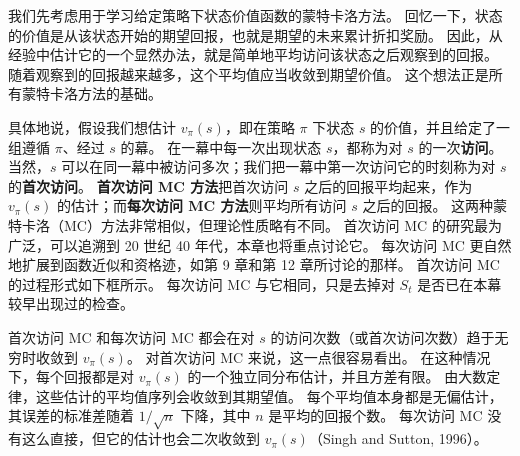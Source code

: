 \documentclass[UTF8, 12pt, fontset=fandol, oneside]{ctexart}
\begin{document}
我们先考虑用于学习给定策略下状态价值函数的蒙特卡洛方法。
回忆一下，状态的价值是从该状态开始的期望回报，也就是期望的未来累计折扣奖励。
因此，从经验中估计它的一个显然办法，就是简单地平均访问该状态之后观察到的回报。
随着观察到的回报越来越多，这个平均值应当收敛到期望价值。
这个想法正是所有蒙特卡洛方法的基础。

具体地说，假设我们想估计 $v_\pi(s)$，即在策略 $\pi$ 下状态 $s$ 的价值，并且给定了一组遵循 $\pi$、经过 $s$ 的幕。
在一幕中每一次出现状态 $s$，都称为对 $s$ 的一次\textbf{访问}。
当然，$s$ 可以在同一幕中被访问多次；我们把一幕中第一次访问它的时刻称为对 $s$ 的\textbf{首次访问}。
\textbf{首次访问 MC 方法}把首次访问 $s$ 之后的回报平均起来，作为 $v_\pi(s)$ 的估计；而\textbf{每次访问 MC 方法}则平均所有访问 $s$ 之后的回报。
这两种蒙特卡洛（MC）方法非常相似，但理论性质略有不同。
首次访问 MC 的研究最为广泛，可以追溯到 20 世纪 40 年代，本章也将重点讨论它。
每次访问 MC 更自然地扩展到函数近似和资格迹，如第 9 章和第 12 章所讨论的那样。
首次访问 MC 的过程形式如下框所示。
每次访问 MC 与它相同，只是去掉对 $S_t$ 是否已在本幕较早出现过的检查。

\begin{center}
\end{center}

首次访问 MC 和每次访问 MC 都会在对 $s$ 的访问次数（或首次访问次数）趋于无穷时收敛到 $v_\pi(s)$。
对首次访问 MC 来说，这一点很容易看出。
在这种情况下，每个回报都是对 $v_\pi(s)$ 的一个独立同分布估计，并且方差有限。
由大数定律，这些估计的平均值序列会收敛到其期望值。
每个平均值本身都是无偏估计，其误差的标准差随着 $1/\sqrt{n}$ 下降，其中 $n$ 是平均的回报个数。
每次访问 MC 没有这么直接，但它的估计也会二次收敛到 $v_\pi(s)$（Singh and Sutton, 1996）。
\end{document}
